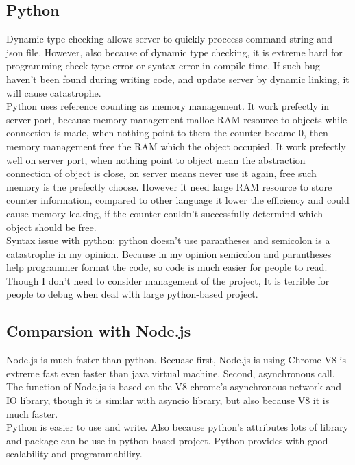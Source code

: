 \documentclass[10pt, a4paper]{IEEEtran}
\begin{document}
    \subsection*{Python}
    Dynamic type checking allows server to quickly proccess command string and json file. However, also because of dynamic type checking, it is extreme hard for programming check type error or syntax error in compile time. If such bug haven't been found during writing code, and update server by dynamic linking, it will cause catastrophe.\\
    Python uses reference counting as memory management. It work prefectly in server port, because memory management malloc RAM resource to objects while connection is made, when nothing point to them the counter became 0, then memory management free the RAM which the object occupied. It work prefectly well on server port, when nothing point to object mean the abstraction connection of object is close, on server means never use it again, free such memory is the prefectly choose. However it need large RAM resource to store counter information, compared to other language it lower the efficiency and could cause memory leaking, if the counter couldn't successfully determind which object should be free.\\
    Syntax issue with python: python doesn't use parantheses and semicolon is a catastrophe in my opinion. Because in my opinion semicolon and parantheses help programmer format the code, so code is much easier for people to read. Though I don't need to consider management of the project, It is terrible for people to debug when deal with large python-based project.\\
    \subsection{Comparsion with Node.js}
    Node.js is much faster than python. Becuase first, Node.js is using Chrome V8 is extreme fast  even faster than java virtual machine. Second, asynchronous call. The function of Node.js is based on the V8 chrome's asynchronous network and IO library, though it is similar with asyncio library, but also because V8 it is much faster.\\
    Python is easier to use and write. Also because python's attributes lots of library and package can be use in python-based project. Python provides with good scalability and programmabiliry.
    

    
    
    

    


    

    


    





    

    
    
\end{document}
